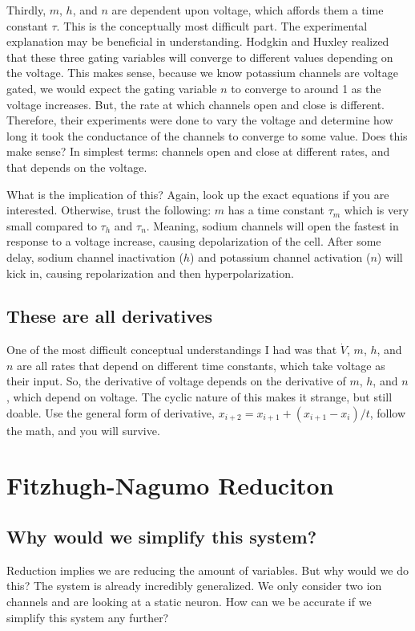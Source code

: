 \documentclass[12pt]{amsart}
\begin{document}
Thirdly, $m$, $h$, and $n$ are dependent upon voltage, which affords them a time constant $\tau$. This is the conceptually most difficult part. The experimental explanation may be beneficial in understanding. Hodgkin and Huxley realized that these three gating variables will converge to different values depending on the voltage. This makes sense, because we know potassium channels are voltage gated, we would expect the gating variable $n$ to converge to around 1 as the voltage increases. But, the rate at which channels open and close is different. Therefore, their experiments were done to vary the voltage and determine how long it took the conductance of the channels to converge to some value. Does this make sense? In simplest terms: channels open and close at different rates, and that depends on the voltage.\newline

What is the implication of this? Again, look up the exact equations if you are interested. Otherwise, trust the following: $m$ has a time constant $\tau_m$ which is very small compared to $\tau_h$ and $\tau_n$. Meaning, sodium channels will open the fastest in response to a voltage increase, causing depolarization of the cell. After some delay, sodium channel inactivation ($h$) and potassium channel activation ($n$) will kick in, causing repolarization and then hyperpolarization. 

\subsection{These are all derivatives} One of the most difficult conceptual understandings I had was that $\dot{V}$, $m$, $h$, and $n$ are all rates that depend on different time constants, which take voltage as their input. So, the derivative of voltage depends on the derivative of $m$, $h$, and $n$, which depend on voltage. The cyclic nature of this makes it strange, but still doable. Use the general form of derivative, $x_{i+2} = x_{i+1} + (x_{i+1} - x_i)/t$, follow the math, and you will survive.

\section{Fitzhugh-Nagumo Reduciton}

\subsection{Why would we simplify this system?} Reduction implies we are reducing the amount of variables. But why would we do this? The system is already incredibly generalized. We only consider two ion channels and are looking at a static neuron. How can we be accurate if we simplify this system any further?\newline
\end{document}
